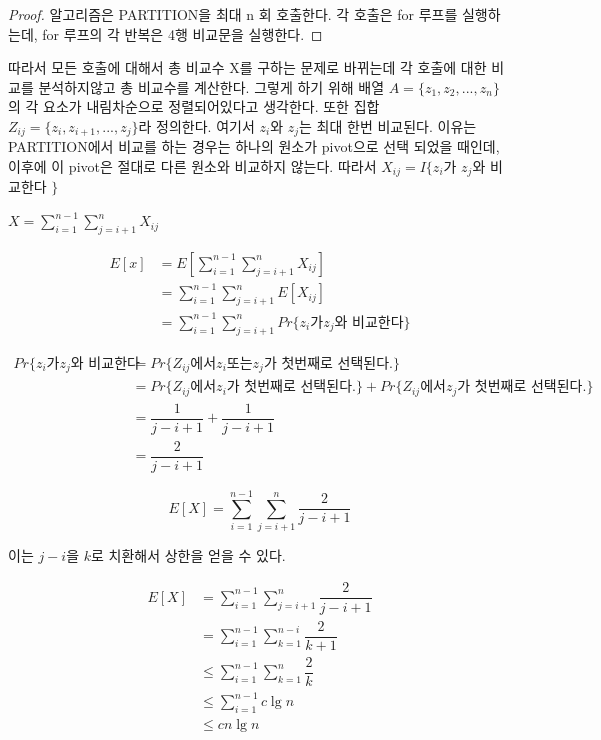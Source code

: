 \documentclass{oblivoir}
\begin{document}
\begin{proof}
    알고리즘은 PARTITION을 최대 n 회 호출한다. 각 호출은 for 루프를 실행하는데, for 루프의 각 반복은 4행 비교문을 실행한다.    
\end{proof}



따라서 모든 호출에 대해서 총 비교수 X를 구하는 문제로 바뀌는데 각 호출에 대한 비교를 분석하지않고 총 비교수를 계산한다.
그렇게 하기 위해 배열 $A = \{z_1 , z_2, ... , z_n\}$의 각 요소가 내림차순으로 정렬되어있다고 생각한다. 또한 집합 $Z_{ij} = \{z_i, z_{i+1}, ..., z_j\}$라 정의한다. 여기서 $z_i$와 $z_j$는 최대 한번 비교된다. 이유는 PARTITION에서 비교를 하는 경우는 하나의 원소가 pivot으로 선택 되었을 때인데, 이후에 이 pivot은 절대로 다른 원소와 비교하지 않는다.
따라서
$X_{ij} = I\{ z_i$가 $z_j$와 비교한다 $\}$

$ X = \sum_{i=1}^{n-1}\sum_{j=i+1}^{n} X_{ij}$

\begin{align*}
    E[x] &= E \left[ \sum_{i=1}^{n-1}\sum_{j=i+1}^{n} X_{ij} \right] \\
    &= \sum_{i=1}^{n-1}\sum_{j=i+1}^{n} E\left[X_{ij} \right] \\
    &= \sum_{i=1}^{n-1}\sum_{j=i+1}^{n}Pr\{ z_i \mbox{가} z_j\mbox{와 비교한다} \} 
\end{align*}    
    
\begin{align*}
    Pr\{ z_i \mbox{가} z_j\mbox{와 비교한다} 
    &= Pr\{ Z_{ij}\mbox{에서} z_i \mbox{또는} z_j\mbox{가 첫번째로 선택된다.}\}\\
    &= Pr\{ Z_{ij} \mbox{에서} z_i \mbox{가 첫번째로 선택된다}.\} + Pr\{ Z_{ij}\mbox{에서} z_j \mbox{가 첫번째로 선택된다.}\} \\
    &= \dfrac{1}{j-i+1} + \dfrac{1}{j-i+1} \\
    &= \dfrac{2}{j-i+1}    
\end{align*}
    

$$E[X] =  \sum_{i=1}^{n-1}\sum_{j=i+1}^{n} \dfrac{2}{j-i+1}$$

이는 $j-i$을 $k$로 치환해서 상한을 얻을 수 있다.

\begin{align*}
    E[X] & = \sum_{i=1}^{n-1}\sum_{j=i+1}^{n} \dfrac{2}{j-i+1}\\
    & =  \sum_{i=1}^{n-1}\sum_{k = 1}^{n-i} \dfrac{2}{k+1} \\
    & \le \sum_{i=1}^{n-1}\sum_{k = 1}^{n} \dfrac{2}{k} \\
    & \le \sum_{i=1}^{n-1} c\lg n \\
    & \le c n \lg n    
\end{align*}
\end{document}
